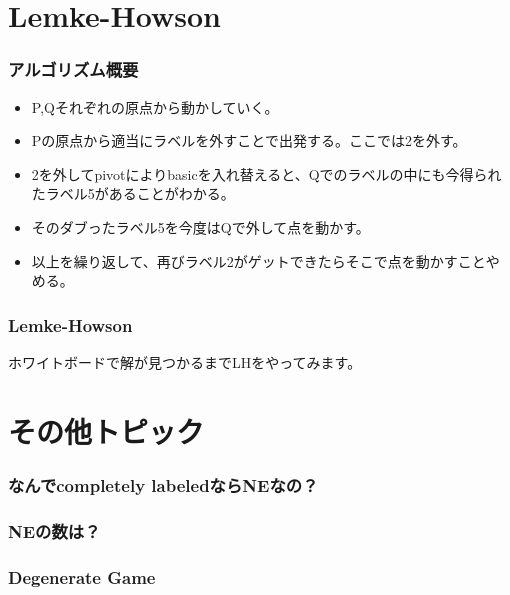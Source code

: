 \documentclass[dvipdfmx, 12pt]{beamer}
\begin{document}
\section{Lemke-Howson}
\begin{frame}\frametitle{アルゴリズム概要}
\begin{itemize}
	\item P,Qそれぞれの原点から動かしていく。
	\item Pの原点から適当にラベルを外すことで出発する。ここでは2を外す。
	\item 2を外してpivotによりbasicを入れ替えると、Qでのラベルの中にも今得られたラベル5があることがわかる。
	\item そのダブったラベル5を今度はQで外して点を動かす。
	\item 以上を繰り返して、再びラベル2がゲットできたらそこで点を動かすことやめる。
\end{itemize}
\end{frame}

\begin{frame}\frametitle{Lemke-Howson}
ホワイトボードで解が見つかるまでLHをやってみます。
\end{frame}

\section{その他トピック}
\begin{frame}\frametitle{なんでcompletely labeledならNEなの？}

\end{frame}

\begin{frame}\frametitle{NEの数は？}

\end{frame}

\begin{frame}\frametitle{Degenerate Game}

\end{frame}
\end{document}

